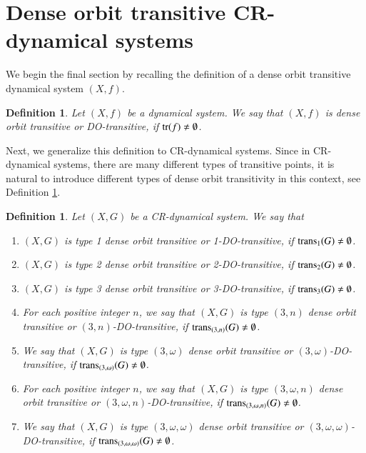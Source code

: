 \documentclass[a4paper,12pt]{article} %
\newcommand{\tr}{\textup{tr}}
\newcommand{\trans}{\textup{trans}}
\newtheorem{definition}[theorem]{Definition}
\begin{document}
\section{Dense orbit transitive CR-dynamical systems} \label{s4}
We begin the final section by recalling the definition of a dense orbit transitive dynamical system $(X,f)$. 
\begin{definition}
Let $(X,f)$ be a dynamical system.  We say that $(X,f)$ is 
 \emph{ \color{blue} dense orbit transitive} or \emph{ \color{blue} DO-transitive},   if $\tr(f)\neq \emptyset$.
\end{definition}
Next, we generalize this definition to CR-dynamical systems.  Since in CR-dynamical systems, there are many different types of transitive points, it is natural to introduce different types of dense orbit transitivity in this context, see Definition \ref{DEDO}.
\begin{definition}\label{DEDO}
Let $(X,G)$ be a CR-dynamical system.  We say that 
\begin{enumerate}
\item  $(X,G)$ is \emph{\color{blue} type 1 dense orbit transitive} or \emph{\color{blue} 1-DO-transitive}, if $\trans_1(G)\neq \emptyset$.
\item  $(X,G)$ is \emph{\color{blue} type 2 dense orbit transitive} or \emph{\color{blue} 2-DO-transitive}, if $\trans_2(G)\neq \emptyset$.
\item  $(X,G)$ is \emph{\color{blue} type 3 dense orbit transitive} or \emph{\color{blue} 3-DO-transitive}, if $\trans_3(G)\neq \emptyset$.
\item  For each positive integer $n$, we say that $(X,G)$ is \emph{\color{blue} type $(3,n)$ dense orbit transitive} or \emph{\color{blue} $(3,n)$-DO-transitive}, if $\trans_{(3,n)}(G)\neq \emptyset$. 
\item We say that $(X,G)$ is \emph{\color{blue} type $(3,\omega)$ dense orbit transitive} or \emph{\color{blue} $(3,\omega)$-DO-transitive}, if $\trans_{(3,\omega)}(G)\neq \emptyset$.
\item  For each positive integer $n$, we say that $(X,G)$ is \emph{\color{blue} type $(3,\omega,n)$ dense orbit transitive} or \emph{\color{blue} $(3,\omega,n)$-DO-transitive}, if $\trans_{(3,\omega,n)}(G)\neq \emptyset$. 
\item We say that $(X,G)$ is \emph{\color{blue} type $(3,\omega,\omega)$ dense orbit transitive} or \emph{\color{blue} $(3,\omega,\omega)$-DO-transitive}, if $\trans_{(3,\omega,\omega)}(G)\neq \emptyset$.
\end{enumerate}
\end{definition}
\end{document}
